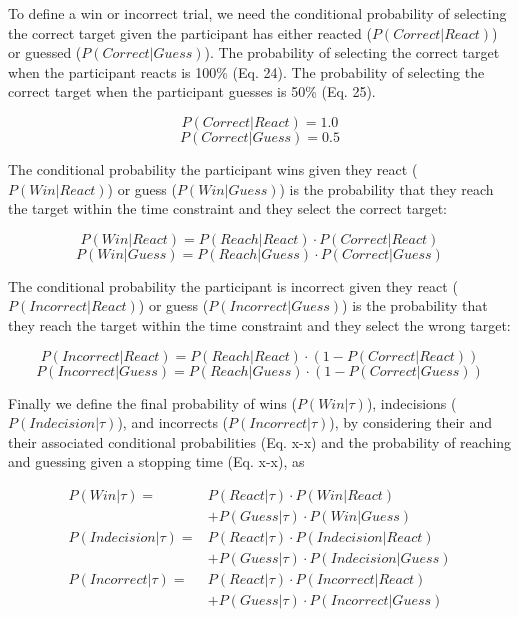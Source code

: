 \documentclass[12pt,letterpaper]{article}
\begin{document}
To define a win or incorrect trial, we need the conditional probability of selecting the correct target given the participant has either reacted ($P(Correct|React)$) or guessed ($P(Correct|Guess)$). The probability of selecting the correct target when the participant reacts is 100\% (Eq. 24). The probability of selecting the correct target when the participant guesses is 50\% (Eq. 25).

\begin{equation}
    P(Correct|React) = 1.0
\end{equation}
\begin{equation}
    P(Correct|Guess) = 0.5
\end{equation}

The conditional probability the participant wins given they react ($P(Win|React)$) or guess ($P(Win|Guess)$) is the probability that they reach the target within the time constraint and they select the correct target:

\begin{equation}
    P(Win|React) = P(Reach|React) \cdot P(Correct|React)
\end{equation}
\begin{equation}
    P(Win|Guess) = P(Reach|Guess) \cdot P(Correct|Guess)
\end{equation}

The conditional probability the participant is incorrect given they react ($P(Incorrect|React)$) or guess ($P(Incorrect|Guess)$) is the probability that they reach the target within the time constraint and they select the wrong target:

\begin{equation}
    P(Incorrect|React) = P(Reach|React) \cdot (1 - P(Correct|React))
\end{equation}
\begin{equation}
    P(Incorrect|Guess) = P(Reach|Guess) \cdot (1 - P(Correct|Guess))
\end{equation}

Finally we define the final probability of wins ($P(Win|\tau)$), indecisions ($P(Indecision|\tau)$), and incorrects ($P(Incorrect|\tau)$), by considering their and their associated conditional probabilities (Eq. x-x) and the probability of reaching and guessing given a stopping time (Eq. x-x), as

\begin{align}
    P(Win|\tau)        = & P(React|\tau) \cdot P(Win|React) \nonumber        \\ &+  P(Guess|\tau) \cdot P(Win|Guess)\\
    P(Indecision|\tau) = & P(React|\tau) \cdot P(Indecision|React) \nonumber \\ &+ P(Guess|\tau) \cdot P(Indecision|Guess) \\
    P(Incorrect|\tau)  = & P(React|\tau) \cdot P(Incorrect|React) \nonumber  \\ &+ P(Guess|\tau) \cdot P(Incorrect|Guess)
\end{align}
\end{document}
